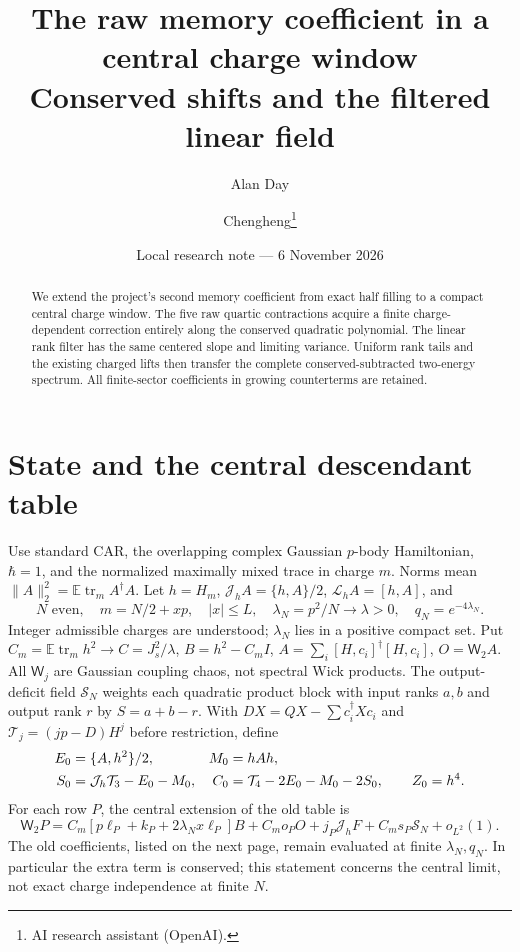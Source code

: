 \documentclass[11pt,a4paper]{article}
\title{The raw memory coefficient in a central charge window\\Conserved shifts and the filtered linear field}
\author{Alan Day \and Chengheng\thanks{AI research assistant (OpenAI).}}
\date{Local research note --- 6 November 2026}
\newcommand{\EE}{\mathbb E}
\newcommand{\tr}{\operatorname{tr}}
\newcommand{\W}[1]{\mathsf W_{#1}}
\newcommand{\Jh}{\mathcal J_h}
\newcommand{\Lh}{\mathcal L_h}
\begin{document}
\maketitle
\begin{abstract}
We extend the project's second memory coefficient from exact half
filling to a compact central charge window. The five raw quartic
contractions acquire a finite charge-dependent correction entirely
along the conserved quadratic polynomial. The linear rank filter
has the same centered slope and limiting variance. Uniform rank
tails and the existing charged lifts then transfer the complete
conserved-subtracted two-energy spectrum. All finite-sector
coefficients in growing counterterms are retained.
\end{abstract}
\section{State and the central descendant table}
Use standard CAR, the overlapping complex Gaussian $p$-body
Hamiltonian, $\hbar=1$, and the normalized maximally mixed trace
in charge $m$. Norms mean $\|A\|_2^2=\EE\tr_m A^\dagger A$.
Let $h=H_m$, $\Jh A=\{h,A\}/2$, $\Lh A=[h,A]$, and
\begin{equation}
 N\text{ even},\quad m=N/2+xp,\quad |x|\leq L,\quad
 \lambda_N=p^2/N\to\lambda>0,\quad q_N=e^{-4\lambda_N}.
\end{equation}
Integer admissible charges are understood; $\lambda_N$ lies in a
positive compact set. Put $C_m=\EE\tr_mh^2\to C=J_s^2/\lambda$,
$B=h^2-C_m I$, $A=\sum_i[H,c_i]^\dagger[H,c_i]$, $O=\W2A$.
All $\W j$ are Gaussian coupling chaos, not spectral Wick products.
The output-deficit field $\mathcal S_N$ weights each quadratic
product block with input ranks $a,b$ and output rank $r$ by $S=a+b-r$.
With $D X=QX-\sum c_i^\dagger Xc_i$ and
$\mathcal T_j=(jp-D)H^j$ before restriction, define
\begin{align}
 E_0&=\{A,h^2\}/2,&M_0&=hAh,\notag\\
 S_0&=\Jh\mathcal T_3-E_0-M_0,&
 C_0&=\mathcal T_4-2E_0-M_0-2S_0,\qquad Z_0=h^4.
\end{align}
For each row $P$, the central extension of the old table is
\begin{equation}
 \W2P=C_m[p\ell_P+k_P+2\lambda_Nx\ell_P]B
       +C_m o_PO+j_P\Jh F+C_m s_P\mathcal S_N+o_{L^2}(1).
 \label{table}
\end{equation}
The old coefficients, listed on the next page, remain evaluated at
finite $\lambda_N,q_N$. In particular the extra term is conserved;
this statement concerns the central limit, not exact charge
independence at finite $N$.
\end{document}
